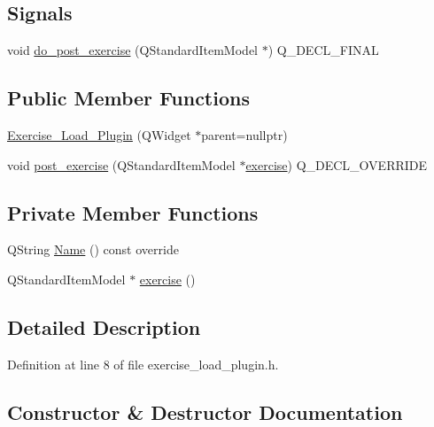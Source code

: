 \subsection*{Signals}
\begin{DoxyCompactItemize}
\item 
void \hyperlink{classExercise__Load__Plugin_a81e0284dc19303bfb0408cf14247ea9c}{do\+\_\+post\+\_\+exercise} (Q\+Standard\+Item\+Model $\ast$) Q\+\_\+\+D\+E\+C\+L\+\_\+\+F\+I\+N\+AL
\end{DoxyCompactItemize}
\subsection*{Public Member Functions}
\begin{DoxyCompactItemize}
\item 
\hyperlink{classExercise__Load__Plugin_a23574d3050cd6fd13c7387b76deb22fd}{Exercise\+\_\+\+Load\+\_\+\+Plugin} (Q\+Widget $\ast$parent=nullptr)
\item 
void \hyperlink{classExercise__Load__Plugin_ad0c7c810dd492a014e17d40cdfe3d35d}{post\+\_\+exercise} (Q\+Standard\+Item\+Model $\ast$\hyperlink{classExercise__Load__Plugin_ab2c84c55120579b1fdb135eb73694837}{exercise}) Q\+\_\+\+D\+E\+C\+L\+\_\+\+O\+V\+E\+R\+R\+I\+DE
\end{DoxyCompactItemize}
\subsection*{Private Member Functions}
\begin{DoxyCompactItemize}
\item 
Q\+String \hyperlink{classExercise__Load__Plugin_af6226d33bef2f1f526a8f37ec33e431c}{Name} () const override
\item 
Q\+Standard\+Item\+Model $\ast$ \hyperlink{classExercise__Load__Plugin_ab2c84c55120579b1fdb135eb73694837}{exercise} ()
\end{DoxyCompactItemize}


\subsection{Detailed Description}


Definition at line 8 of file exercise\+\_\+load\+\_\+plugin.\+h.



\subsection{Constructor \& Destructor Documentation}
\mbox{\label{classExercise__Load__Plugin_a23574d3050cd6fd13c7387b76deb22fd}} 
